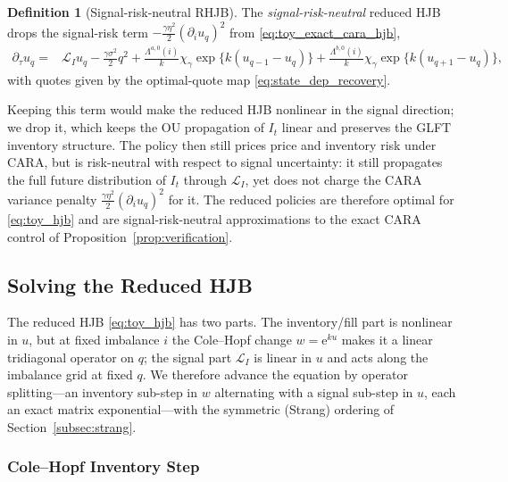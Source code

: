 \documentclass[11pt,a4paper]{article}
\newcommand{\Lcal}{\mathcal{L}}
\newcommand{\e}{\mathrm e}
\theoremstyle{plain}
\theoremstyle{definition}
\newtheorem{definition}{Definition}[section]
\begin{document}
\begin{definition}[Signal-risk-neutral RHJB]
\label{def:srn_rhjb}
The \emph{signal-risk-neutral} reduced HJB drops the signal-risk term
\(-\tfrac{\gamma\eta^2}{2}(\partial_i u_q)^2\) from \eqref{eq:toy_exact_cara_hjb},
\begin{align}
\partial_\tau u_q
={}&
\Lcal_I u_q-\frac{\gamma\sigma^2}{2}q^2
+\frac{\Lambda^{a,0}(i)}{k}\chi_\gamma\exp\{k(u_{q-1}-u_q)\}
+\frac{\Lambda^{b,0}(i)}{k}\chi_\gamma\exp\{k(u_{q+1}-u_q)\},
\label{eq:toy_hjb}
\end{align}
with quotes given by the optimal-quote map \eqref{eq:state_dep_recovery}.
\end{definition}

Keeping this term would make the reduced HJB nonlinear in the signal direction;
we drop it, which keeps the OU propagation of \(I_t\) linear and preserves the
GLFT inventory structure.  The policy then still prices price and inventory risk
under CARA, but is risk-neutral with respect to signal uncertainty: it still
propagates the full future distribution of \(I_t\) through \(\Lcal_I\), yet does
not charge the CARA variance penalty \(\tfrac{\gamma\eta^2}{2}(\partial_i u_q)^2\)
for it.  The reduced policies are therefore optimal for \eqref{eq:toy_hjb} and
are signal-risk-neutral approximations to the exact CARA control of
Proposition~\ref{prop:verification}.

\subsection{Solving the Reduced HJB}

The reduced HJB \eqref{eq:toy_hjb} has two parts.  The inventory/fill part is
nonlinear in \(u\), but at fixed imbalance \(i\) the Cole--Hopf change
\(w=\e^{ku}\) makes it a linear tridiagonal operator on \(q\); the signal part
\(\Lcal_I\) is linear in \(u\) and acts along the imbalance grid at fixed
\(q\).  We therefore advance the equation by operator splitting---an inventory
sub-step in \(w\) alternating with a signal sub-step in \(u\), each an exact
matrix exponential---with the symmetric (Strang) ordering of
Section~\ref{subsec:strang}.

\subsubsection{Cole--Hopf Inventory Step}
\end{document}
